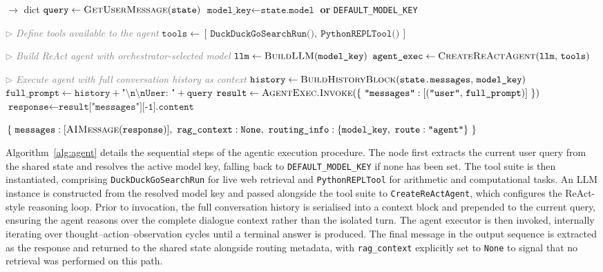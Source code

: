 \documentclass[12pt,a4paper]{article}
\newcommand{\ty}[1]{\texttt{#1}}
\newcommand{\cmt}[1]{\textcolor{gray}{$\triangleright$ \textit{#1}}}
\begin{document}
\begin{algorithm}[H]
\caption{Agent node implementation showing ReAct-style execution with tool integration.}
\label{alg:agent}
\begin{algorithmic}[1]
\Procedure{AgentNode}{\ty{state}: ChatState} $\to$ dict
  \State $\ty{query}     \gets \Call{GetUserMessage}{\ty{state}}$
  \State $\ty{model\_key} \gets \ty{state.model}$ \textbf{ or } \ty{DEFAULT\_MODEL\_KEY}
 
  \State
  \State \cmt{Define tools available to the agent}
  \State $\ty{tools} \gets [\,\ty{DuckDuckGoSearchRun()},\ \ty{PythonREPLTool()}\,]$
 
  \State
  \State \cmt{Build ReAct agent with orchestrator-selected model}
  \State $\ty{llm}            \gets \Call{BuildLLM}{\ty{model\_key}}$
  \State $\ty{agent\_exec}    \gets \Call{CreateReActAgent}{\ty{llm},\, \ty{tools}}$
 
  \State
  \State \cmt{Execute agent with full conversation history as context}
  \State $\ty{history}        \gets \Call{BuildHistoryBlock}{\ty{state.messages},\, \ty{model\_key}}$
  \State $\ty{full\_prompt}   \gets \ty{history} + \texttt{"\textbackslash n\textbackslash nUser: "} + \ty{query}$
  \State $\ty{result}         \gets \Call{AgentExec.Invoke}{\{\ \ty{"messages"}: [(\ty{"user"},\, \ty{full\_prompt})]\ \}}$
  \State $\ty{response}       \gets \ty{result["messages"][-1].content}$
 
  \State
  \State \Return $\{\ \ty{messages}: [\Call{AIMessage}{\ty{response}}],\ \ty{rag\_context}: \ty{None},\ \ty{routing\_info}: \{\ty{model\_key},\ \ty{route}: \ty{"agent"}\}\ \}$
\EndProcedure
\end{algorithmic}
\end{algorithm}

Algorithm~\ref{alg:agent} details the sequential steps of the agentic execution procedure. The node first extracts the current user query from the shared state and resolves the active model key, falling back to \texttt{DEFAULT\_MODEL\_KEY} if none has been set. The tool suite is then instantiated, comprising \texttt{DuckDuckGoSearchRun} for live web retrieval and \texttt{PythonREPLTool} for arithmetic and computational tasks. An LLM instance is constructed from the resolved model key and passed alongside the tool suite to \texttt{CreateReActAgent}, which configures the ReAct-style reasoning loop. Prior to invocation, the full conversation history is serialised into a context block and prepended to the current query, ensuring the agent reasons over the complete dialogue context rather than the isolated turn. The agent executor is then invoked, internally iterating over thought--action--observation cycles until a terminal answer is produced. The final message in the output sequence is extracted as the response and returned to the shared state alongside routing metadata, with \texttt{rag\_context} explicitly set to \texttt{None} to signal that no retrieval was performed on this path.
\end{document}
